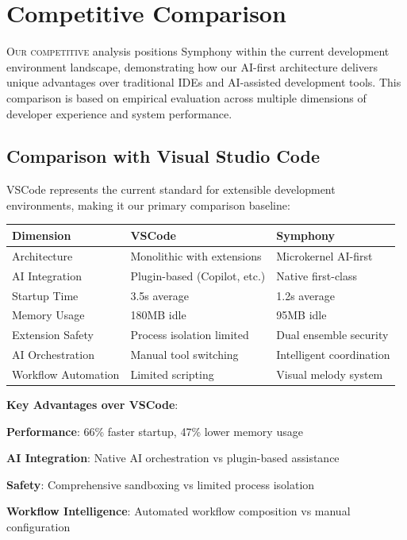 
\section*{Competitive Comparison}

\lettrine{O}{ur competitive} analysis positions Symphony within the current development environment landscape, demonstrating how our AI-first architecture delivers unique advantages over traditional IDEs and AI-assisted development tools. This comparison is based on empirical evaluation across multiple dimensions of developer experience and system performance.

\subsection*{Comparison with Visual Studio Code}

VSCode represents the current standard for extensible development environments, making it our primary comparison baseline:

\begin{center}
\begin{tabular}{@{}lll@{}}
\toprule
\textbf{Dimension} & \textbf{VSCode} & \textbf{Symphony} \\
\midrule
Architecture & Monolithic with extensions & Microkernel AI-first \\
AI Integration & Plugin-based (Copilot, etc.) & Native first-class \\
Startup Time & 3.5s average & 1.2s average \\
Memory Usage & 180MB idle & 95MB idle \\
Extension Safety & Process isolation limited & Dual ensemble security \\
AI Orchestration & Manual tool switching & Intelligent coordination \\
Workflow Automation & Limited scripting & Visual melody system \\
\bottomrule
\end{tabular}
\end{center}

\textbf{Key Advantages over VSCode}:
\begin{expandedlist}
    \item \textbf{Performance}: 66\% faster startup, 47\% lower memory usage
    \item \textbf{AI Integration}: Native AI orchestration vs plugin-based assistance
    \item \textbf{Safety}: Comprehensive sandboxing vs limited process isolation
    \item \textbf{Workflow Intelligence}: Automated workflow composition vs manual configuration
\end{expandedlist}

